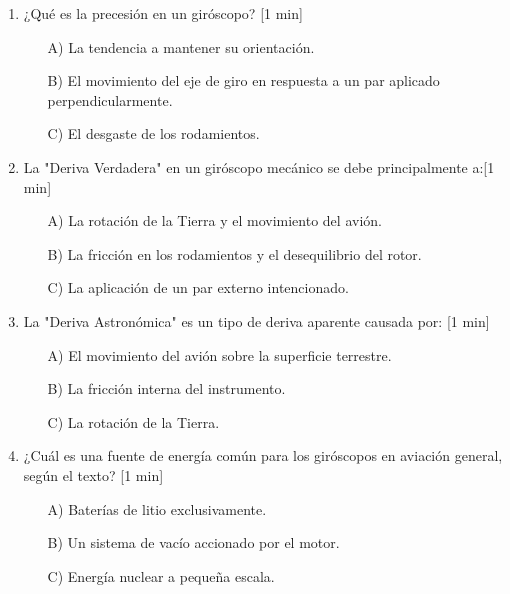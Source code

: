 \begin{enumerate}
\item ¿Qué es la precesión en un giróscopo? [1 min]

	\begin{itemize}
		\item[A)] La tendencia a mantener su orientación.
		\item[B)] El movimiento del eje de giro en respuesta a un par aplicado perpendicularmente.
		\item[C)] El desgaste de los rodamientos.\\
	\end{itemize}

\item La "Deriva Verdadera" en un giróscopo mecánico se debe principalmente a:[1 min]

	\begin{itemize}
		\item[A)]  La rotación de la Tierra y el movimiento del avión.
		\item[B)] La fricción en los rodamientos y el desequilibrio del rotor.
		\item[C)]  La aplicación de un par externo intencionado.\\
	\end{itemize}

\item La "Deriva Astronómica" es un tipo de deriva aparente causada por: [1 min]

	\begin{itemize}
		\item[A)]  El movimiento del avión sobre la superficie terrestre.
		\item[B)] La fricción interna del instrumento.
		\item[C)]  La rotación de la Tierra.\\
	\end{itemize}

\item ¿Cuál es una fuente de energía común para los giróscopos en aviación general, según el texto? [1 min]

	\begin{itemize}
		\item[A)]  Baterías de litio exclusivamente.
		\item[B)] Un sistema de vacío accionado por el motor.
		\item[C)]  Energía nuclear a pequeña escala.\\
	\end{itemize}


\end{enumerate}
